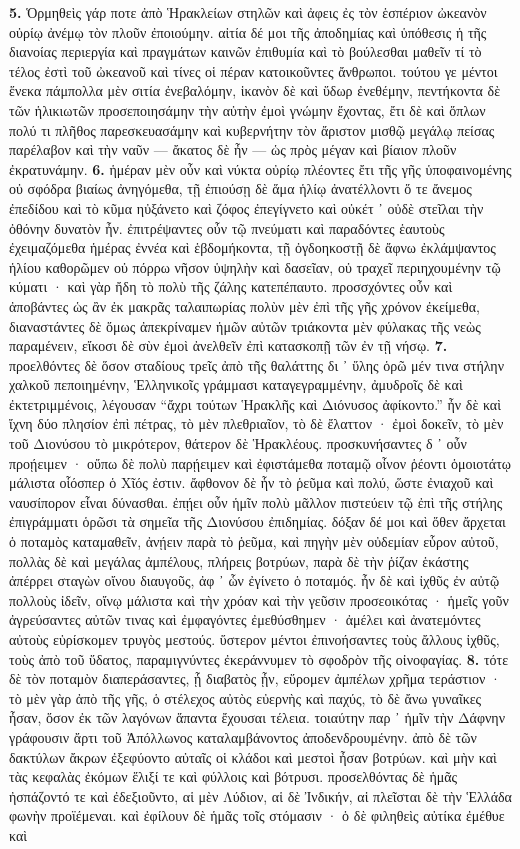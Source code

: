\documentclass[a4paper, 11pt, oneside, polutonikogreek, german]{article}
\begin{document}
\textbf{5.} Ὁρμηθεὶς γάρ ποτε ἀπὸ Ἡρακλείων στηλῶν καὶ ἀφεις ἐς τὸν ἑσπέριον ὠκεανὸν οὐρίῳ ἀνέμῳ τὸν πλοῦν ἐποιούμην. αἰτία δέ μοι τῆς ἀποδημίας καὶ ὑπόθεσις ἡ τῆς διανοίας περιεργία καὶ πραγμάτων καινῶν ἐπιθυμία καὶ τὸ βούλεσθαι μαθεῖν τί τὸ τέλος ἐστὶ τοῦ ὠκεανοῦ καὶ τίνες οἱ πέραν κατοικοῦντες ἄνθρωποι. τούτου γε μέντοι ἕνεκα πάμπολλα μὲν σιτία ἐνεβαλόμην, ἱκανὸν δὲ καὶ ὕδωρ ἐνεθέμην, πεντήκοντα δὲ τῶν ἡλικιωτῶν προσεποιησάμην τὴν αὐτὴν ἐμοὶ γνώμην ἔχοντας, ἔτι δὲ καὶ ὅπλων πολύ τι πλῆθος παρεσκευασάμην καὶ κυβερνήτην τὸν ἄριστον μισθῷ μεγάλῳ πείσας παρέλαβον καὶ τὴν ναῦν --- ἄκατος δὲ ἦν --- ὡς πρὸς μέγαν καὶ βίαιον πλοῦν ἐκρατυνάμην. \textbf{6.} ἡμέραν μὲν οὖν καὶ νύκτα οὐρίῳ πλέοντες ἔτι τῆς γῆς ὑποφαινομένης οὐ σφόδρα βιαίως ἀνηγόμεθα, τῇ ἐπιούσῃ δὲ ἅμα ἡλίῳ ἀνατέλλοντι ὅ τε ἄνεμος ἐπεδίδου καὶ τὸ κῦμα ηὐξάνετο καὶ ζόφος ἐπεγίγνετο καὶ οὐκέτ ᾽ οὐδὲ στεῖλαι τὴν ὀθόνην δυνατὸν ἦν. ἐπιτρέψαντες οὖν τῷ πνεύματι καὶ παραδόντες ἑαυτοὺς ἐχειμαζόμεθα ἡμέρας ἐννέα καὶ ἑβδομήκοντα, τῇ ὀγδοηκοστῇ δὲ ἄφνω ἐκλάμψαντος ἡλίου καθορῶμεν οὐ πόρρω νῆσον ὑψηλὴν καὶ δασεῖαν, οὐ τραχεῖ περιηχουμένην τῷ κύματι · καὶ γὰρ ἤδη τὸ πολὺ τῆς ζάλης κατεπέπαυτο. προσσχόντες οὖν καὶ ἀποβάντες ὡς ἂν ἐκ μακρᾶς ταλαιπωρίας πολὺν μὲν ἐπὶ τῆς γῆς χρόνον ἐκείμεθα, διαναστάντες δὲ ὅμως ἀπεκρίναμεν ἡμῶν αὐτῶν τριάκοντα μὲν φύλακας τῆς νεὼς παραμένειν, εἴκοσι δὲ σὺν ἐμοὶ ἀνελθεῖν ἐπὶ κατασκοπῇ τῶν ἐν τῇ νήσῳ. \textbf{7.} προελθόντες δὲ ὅσον σταδίους τρεῖς ἀπὸ τῆς θαλάττης δι ᾽ ὕλης ὁρῶ μέν τινα στήλην χαλκοῦ πεποιημένην, Ἑλληνικοῖς γράμμασι καταγεγραμμένην, ἀμυδροῖς δὲ καὶ ἐκτετριμμένοις, λέγουσαν "`ἄχρι τούτων Ἡρακλῆς καὶ Διόνυσος ἀφίκοντο."' ἦν δὲ καὶ ἴχνη δύο πλησίον ἐπὶ πέτρας, τὸ μὲν πλεθριαῖον, τὸ δὲ ἔλαττον · ἐμοὶ δοκεῖν, τὸ μὲν τοῦ Διονύσου τὸ μικρότερον, θάτερον δὲ Ἡρακλέους. προσκυνήσαντες δ ᾽ οὖν προῄειμεν · οὔπω δὲ πολὺ παρῄειμεν καὶ ἐφιστάμεθα ποταμῷ οἶνον ῥέοντι ὁμοιοτάτῳ μάλιστα οἷόσπερ ὁ Χῖός ἐστιν. ἄφθονον δὲ ἧν τὸ ῥεῦμα καὶ πολύ, ὥστε ἐνιαχοῦ καὶ ναυσίπορον εἶναι δύνασθαι. ἐπῄει οὖν ἡμῖν πολὺ μᾶλλον πιστεύειν τῷ ἐπὶ τῆς στήλης ἐπιγράμματι ὁρῶσι τὰ σημεῖα τῆς Διονύσου ἐπιδημίας. δόξαν δέ μοι καὶ ὅθεν ἄρχεται ὁ ποταμὸς καταμαθεῖν, ἀνῄειν παρὰ τὸ ῥεῦμα, καὶ πηγὴν μὲν οὐδεμίαν εὗρον αὐτοῦ, πολλὰς δὲ καὶ μεγάλας ἀμπέλους, πλήρεις βοτρύων, παρὰ δὲ τὴν ῥίζαν ἑκάστης ἀπέρρει σταγὼν οἴνου διαυγοῦς, ἀφ ᾽ ὧν ἐγίνετο ὁ ποταμός. ἦν δὲ καὶ ἰχθῦς ἐν αὐτῷ πολλοὺς ἰδεῖν, οἴνῳ μάλιστα καὶ τὴν χρόαν καὶ τὴν γεῦσιν προσεοικότας · ἡμεῖς γοῦν ἀγρεύσαντες αὐτῶν τινας καὶ ἐμφαγόντες ἐμεθύσθημεν · ἀμέλει καὶ ἀνατεμόντες αὐτοὺς εὑρίσκομεν τρυγὸς μεστούς. ὕστερον μέντοι ἐπινοήσαντες τοὺς ἄλλους ἰχθῦς, τοὺς ἀπὸ τοῦ ὕδατος, παραμιγνύντες ἐκεράννυμεν τὸ σφοδρὸν τῆς οἰνοφαγίας. \textbf{8.} τότε δὲ τὸν ποταμὸν διαπεράσαντες, ᾗ διαβατὸς ᾖν, εὕρομεν ἀμπέλων χρῆμα τεράστιον · τὸ μὲν γὰρ ἀπὸ τῆς γῆς, ὁ στέλεχος αὐτὸς εὐερνὴς καὶ παχύς, τὸ δὲ ἄνω γυναῖκες ἦσαν, ὅσον ἐκ τῶν λαγόνων ἅπαντα ἔχουσαι τέλεια. τοιαύτην παρ ᾽ ἡμῖν τὴν Δάφνην γράφουσιν ἄρτι τοῦ Ἀπόλλωνος καταλαμβάνοντος ἀποδενδρουμένην. ἀπὸ δὲ τῶν δακτύλων ἄκρων ἐξεφύοντο αὐταῖς οἱ κλάδοι καὶ μεστοὶ ἦσαν βοτρύων. καὶ μὴν καὶ τὰς κεφαλὰς ἐκόμων ἕλιξί τε καὶ φύλλοις καὶ βότρυσι. προσελθόντας δὲ ἡμᾶς ἠσπάζοντό τε καὶ ἐδεξιοῦντο, αἱ μὲν Λύδιον, αἱ δὲ Ἰνδικήν, αἱ πλεῖσται δὲ τὴν Ἑλλάδα φωνὴν προϊέμεναι. καὶ ἐφίλουν δὲ ἡμᾶς τοῖς στόμασιν · ὁ δὲ φιληθεὶς αὐτίκα ἐμέθυε καὶ 
\end{document}
